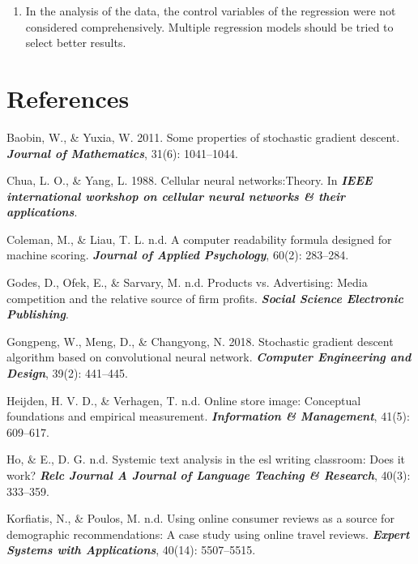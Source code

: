 \documentclass[12pt,a4paper,]{article}
\providecommand{\tightlist}{%
  \setlength{\itemsep}{0pt}\setlength{\parskip}{0pt}}
\begin{document}
\begin{enumerate}
\def\labelenumi{\arabic{enumi}.}
\tightlist
\item
  In the analysis of the data, the control variables of the regression
  were not considered comprehensively. Multiple regression models should
  be tried to select better results.
\end{enumerate}

\hypertarget{references}{%
\section*{References}\label{references}}

\hypertarget{refs}{}
\leavevmode\hypertarget{ref-WangBaoBin}{}%
Baobin, W., \& Yuxia, W. 2011. Some properties of stochastic gradient
descent. \emph{\textbf{Journal of Mathematics}}, 31(6): 1041--1044.

\leavevmode\hypertarget{ref-Chua1988Cellular}{}%
Chua, L. O., \& Yang, L. 1988. Cellular neural networks:Theory. In
\emph{\textbf{IEEE international workshop on cellular neural networks \&
their applications}}.

\leavevmode\hypertarget{ref-ColemanA}{}%
Coleman, M., \& Liau, T. L. n.d. A computer readability formula designed
for machine scoring. \emph{\textbf{Journal of Applied Psychology}},
60(2): 283--284.

\leavevmode\hypertarget{ref-GodesProducts}{}%
Godes, D., Ofek, E., \& Sarvary, M. n.d. Products vs. Advertising: Media
competition and the relative source of firm profits.
\emph{\textbf{Social Science Electronic Publishing}}.

\leavevmode\hypertarget{ref-WangGongPeng}{}%
Gongpeng, W., Meng, D., \& Changyong, N. 2018. Stochastic gradient
descent algorithm based on convolutional neural network.
\emph{\textbf{Computer Engineering and Design}}, 39(2): 441--445.

\leavevmode\hypertarget{ref-HeijdenOnline}{}%
Heijden, H. V. D., \& Verhagen, T. n.d. Online store image: Conceptual
foundations and empirical measurement. \emph{\textbf{Information \&
Management}}, 41(5): 609--617.

\leavevmode\hypertarget{ref-HoSystemic}{}%
Ho, \& E., D. G. n.d. Systemic text analysis in the esl writing
classroom: Does it work? \emph{\textbf{Relc Journal A Journal of
Language Teaching \& Research}}, 40(3): 333--359.

\leavevmode\hypertarget{ref-KorfiatisUsing}{}%
Korfiatis, N., \& Poulos, M. n.d. Using online consumer reviews as a
source for demographic recommendations: A case study using online travel
reviews. \emph{\textbf{Expert Systems with Applications}}, 40(14):
5507--5515.
\end{document}
